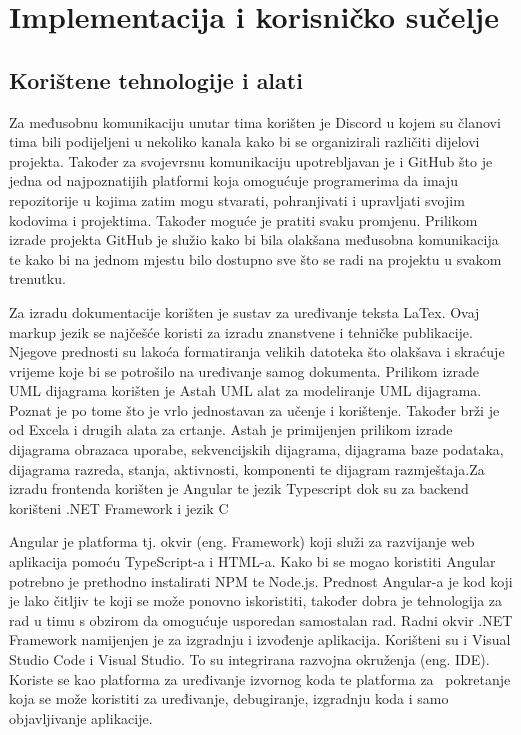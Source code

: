 \chapter{Implementacija i korisničko sučelje}
		
		
		\section{Korištene tehnologije i alati}
		
		
			
			 {Za međusobnu komunikaciju unutar tima korišten je Discord u kojem su članovi tima bili podijeljeni u nekoliko kanala kako bi se organizirali različiti dijelovi projekta. Također za svojevrsnu komunikaciju upotrebljavan je i GitHub što je jedna od najpoznatijih platformi koja omogućuje programerima da imaju repozitorije u kojima zatim mogu stvarati, pohranjivati i upravljati svojim kodovima i projektima. Također moguće je pratiti svaku promjenu. Prilikom izrade projekta GitHub je služio kako bi bila olakšana međusobna komunikacija te kako bi na jednom mjestu bilo dostupno sve što se radi na projektu u svakom trenutku.}
			 
			 {Za izradu dokumentacije korišten je sustav za uređivanje teksta LaTex. Ovaj markup jezik se najčešće koristi za izradu znanstvene i tehničke publikacije. Njegove prednosti su lakoća formatiranja velikih datoteka što olakšava i skraćuje vrijeme koje bi se potrošilo na uređivanje samog dokumenta. Prilikom izrade UML dijagrama korišten je Astah UML alat za modeliranje UML dijagrama. Poznat je po tome što je vrlo jednostavan za učenje i korištenje. Također brži je od Excela i drugih alata za crtanje. Astah je primijenjen prilikom izrade dijagrama obrazaca uporabe, sekvencijskih dijagrama, dijagrama baze podataka,  dijagrama razreda, stanja, aktivnosti, komponenti te dijagram razmještaja.Za izradu frontenda korišten je Angular te jezik Typescript dok su za backend korišteni .NET Framework i jezik C}
			 
			 
			 
			 {Angular je platforma tj. okvir (eng. Framework) koji služi za razvijanje web aplikacija pomoću TypeScript-a i HTML-a. Kako bi se mogao koristiti Angular potrebno je prethodno instalirati NPM te Node.js. Prednost Angular-a je kod koji je lako čitljiv te koji se može ponovno iskoristiti, također dobra je tehnologija za rad u timu s obzirom da omogućuje usporedan samostalan rad. Radni okvir .NET Framework namijenjen je za izgradnju i izvođenje aplikacija. Korišteni su i Visual Studio Code i Visual Studio. To su integrirana razvojna okruženja (eng. IDE). Koriste se kao platforma za uređivanje izvornog koda te platforma za  pokretanje koja se može koristiti za uređivanje, debugiranje, izgradnju koda i samo objavljivanje aplikacije.}
			 

